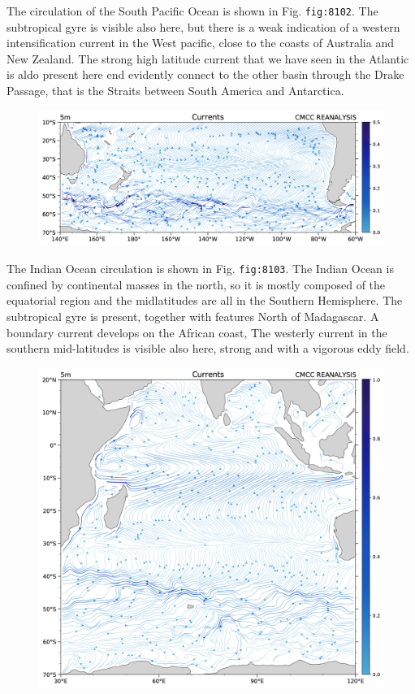 The circulation of the South Pacific Ocean is shown in Fig.
\texttt{fig:8102}. The subtropical gyre is visible also here, but there
is a weak indication of a western intensification current in the West
pacific, close to the coasts of Australia and New Zealand. The strong
high latitude current that we have seen in the Atlantic is aldo present
here end evidently connect to the other basin through the Drake Passage,
that is the Straits between South America and Antarctica.

\begin{figure}
	\centering
	\includegraphics[width = .7 \textwidth]{figs/GD/UVstream5mGLOBSP.png}
	\caption{} \label{fig:}
\end{figure}

The Indian Ocean circulation is shown in Fig. \texttt{fig:8103}. The
Indian Ocean is confined by continental masses in the north, so it is
mostly composed of the equatorial region and the midlatitudes are all in
the Southern Hemisphere. The subtropical gyre is present, together with
features North of Madagascar. A boundary current develops on the African
coast, The westerly current in the southern mid-latitudes is visible
also here, strong and with a vigorous eddy field.

\begin{figure}
	\centering
	\includegraphics[width = .7 \textwidth]{figs/GD/UVstream5mGLOBIND.png}
	\caption{} \label{fig:}
\end{figure}

